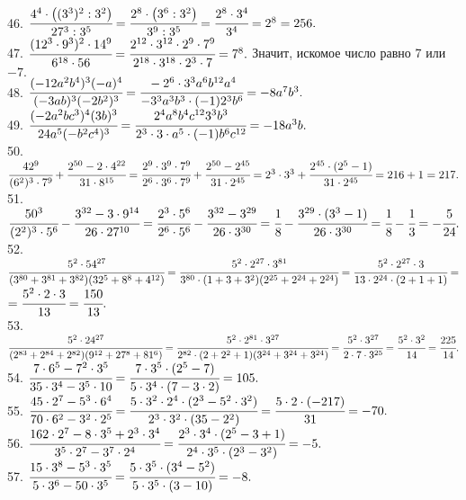 46. $\cfrac{4^4\cdot\left((3^3)^2: 3^2\right)}{27^3:3^5}=\cfrac{2^8\cdot\left(3^6:3^2\right)}{3^9:3^5}=
\cfrac{2^8\cdot3^4}{3^4}=2^8=256.$\\
47. $\cfrac{(12^3\cdot9^3)^2\cdot14^9}{6^{18}\cdot56}=\cfrac{2^{12}\cdot3^{12}\cdot2^9\cdot7^9}{2^{18}\cdot3^{18}\cdot2^3\cdot7}=7^8.$ Значит, искомое число равно 7 или $-7.$\\
48. $\cfrac{(-12a^2b^4)^3(-a)^4}{(-3ab)^3(-2b^2)^3}=\cfrac{-2^6\cdot 3^3 a^6 b^{12}a^4}{-3^3 a^3 b^3\cdot(-1)2^3 b^6}=-8a^7b^3.$\\
49. $\cfrac{(-2a^2bc^3)^4(3b)^3}{24a^5(-b^2c^4)^3}=\cfrac{2^4 a^8 b^4 c^{12}3^3 b^3}{2^3\cdot 3 \cdot a^5\cdot(-1)b^6c^{12}}=-18a^3b.$\\
50. $\cfrac{42^9}{(6^2)^3\cdot7^9}+\cfrac{2^{50}-2\cdot4^{22}}{31\cdot8^{15}}=\cfrac{2^9\cdot3^9\cdot7^9}{2^6\cdot3^6\cdot7^9}+\cfrac{2^{50}-2^{45}}{31\cdot2^{45}}=
2^3\cdot3^3+\cfrac{2^{45}\cdot(2^5-1)}{31\cdot2^{45}}=216+1=217.$\\
51. $\cfrac{50^3}{(2^2)^3\cdot5^6}-\cfrac{3^{32}-3\cdot9^{14}}{26\cdot27^{10}}=\cfrac{2^3\cdot5^6}{2^6\cdot5^6}-\cfrac{3^{32}-3^{29}}{26\cdot3^{30}}=
\cfrac{1}{8}-\cfrac{3^{29}\cdot(3^3-1)}{26\cdot3^{30}}=\cfrac{1}{8}-\cfrac{1}{3}=-\cfrac{5}{24}.$\\
52. $\cfrac{5^2\cdot54^{27}}{(3^{80}+3^{81}+3^{82})(32^5+8^8+4^{12})}=\cfrac{5^2\cdot2^{27}\cdot3^{81}}{3^{80}\cdot(1+3+3^2)(2^{25}+2^{24}+2^{24})}=
\cfrac{5^2\cdot2^{27}\cdot3}{13\cdot2^{24}\cdot(2+1+1)}=$\\$=\cfrac{5^2\cdot2\cdot3}{13}=\cfrac{150}{13}.$\\
53. $\cfrac{5^2\cdot24^{27}}{(2^{83}+2^{84}+2^{82})(9^{12}+27^8+81^{6})}=\cfrac{5^2\cdot2^{81}\cdot3^{27}}{2^{82}\cdot(2+2^2+1)(3^{24}+3^{24}+3^{24})}=
\cfrac{5^2\cdot3^{27}}{2\cdot7\cdot3^{25}}=\cfrac{5^2\cdot3^2}{14}=\cfrac{225}{14}.$\\
54. $\cfrac{7\cdot6^5-7^2\cdot3^5}{35\cdot3^4-3^5\cdot10}=
\cfrac{7\cdot3^5\cdot(2^5-7)}{5\cdot3^4\cdot(7-3\cdot2)}=105.$\\
55. $\cfrac{45\cdot2^7-5^3\cdot6^4}{70\cdot6^2-3^2\cdot2^5}=
\cfrac{5\cdot3^2\cdot2^4\cdot(2^3-5^2\cdot3^2)}{2^3\cdot3^2\cdot(35-2^2)}=
\cfrac{5\cdot2\cdot(-217)}{31}=-70.$\\
56. $\cfrac{162\cdot2^7-8\cdot3^5+2^3\cdot3^4}{3^5\cdot2^7-3^7\cdot2^4}=
\cfrac{2^3\cdot3^4\cdot(2^5-3+1)}{2^4\cdot3^5\cdot(2^3-3^2)}=-5.$\\
57. $\cfrac{15\cdot3^8-5^3\cdot3^5}{5\cdot3^6-50\cdot3^5}=
\cfrac{5\cdot3^5\cdot(3^4-5^2)}{5\cdot3^5\cdot(3-10)}=-8.$\\
